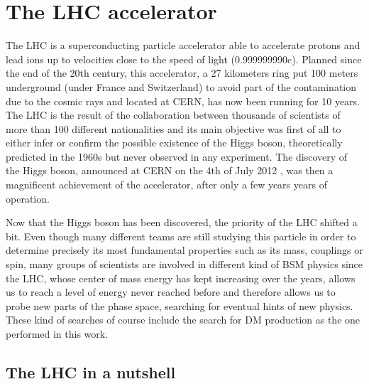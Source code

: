 \documentclass[a4paper, 10pt, openright]{report}
\begin{document}
\section{The \acs{LHC} accelerator} \label{section:LHC}

The \acf{LHC} is a superconducting particle accelerator able to accelerate protons and lead ions up to velocities close to the speed of light (0.999999990c). Planned since the end of the 20th century, this accelerator, a 27 kilometers ring put 100 meters underground (under France and Switzerland) to avoid part of the contamination due to the cosmic rays and located at \ac{CERN}, has now been running for 10 years. The \ac{LHC} is the result of the collaboration between thousands of scientists of more than 100 different nationalities and its main objective was first of all to either infer or confirm the possible existence of the Higgs boson, theoretically predicted in the 1960s \cite{HiggsPostulate1, HiggsPostulate2} but never observed in any experiment. The discovery of the Higgs boson, announced at \ac{CERN} on the 4th of July 2012 \cite{HiggsDiscovery1, HiggsDiscovery2}, was then a magnificent achievement of the accelerator, after only a few years years of operation.

Now that the Higgs boson has been discovered, the priority of the \ac{LHC} shifted a bit. Even though many different teams are still studying this particle in order to determine precisely its most fundamental properties such as its mass, couplings or spin, many groups of scientists are involved in different kind of \ac{BSM} physics since the \ac{LHC}, whose center of mass energy has kept increasing over the years, allows us to reach a level of energy never reached before and therefore allows us to probe new parts of the phase space, searching for eventual hints of new physics. These kind of searches of course include the search for \ac{DM} production as the one performed in this work. 


\subsection{The \acs{LHC} in a nutshell}\label{section:LHCNut}
\end{document}
